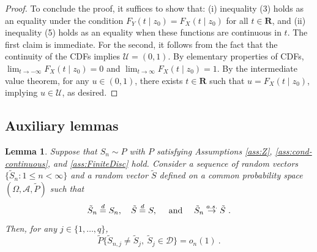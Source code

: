 \documentclass[11pt]{article}
\numberwithin{equation}{section}
\newtheorem{lemma}{Lemma}%
\begin{document}
\begin{proof}
To conclude the proof, it suffices to show that:  
(i) inequality (3) holds as an equality under the condition \( F_Y(t \mid z_{0}) = F_X(t \mid z_{0}) \) for all \( t \in \mathbf{R} \), and  
(ii) inequality (5) holds as an equality when these functions are continuous in \( t \).  
The first claim is immediate. For the second, it follows from the fact that the continuity of the CDFs implies \( \mathcal{U} = (0,1) \). By elementary properties of CDFs, $
\lim_{t \to -\infty} F_X(t \mid z_{0}) = 0$ and $\lim_{t \to \infty} F_X(t \mid z_{0}) = 1$. By the intermediate value theorem, for any \( u \in (0,1) \), there exists \( t \in \mathbf{R} \) such that \( u = F_X(t \mid z_{0}) \), implying \( u \in \mathcal{U} \), as desired.
\end{proof}

\subsection{Auxiliary lemmas}

\begin{lemma}
\label{lemma:equal-value-at-limit-S} 
Suppose that $S_n \sim P$ with $P$ satisfying Assumptions \ref{ass:Z}, \ref{ass:cond-continuous}, and \ref{ass:FiniteDisc} hold. Consider a sequence of random vectors $\{\tilde{S}_{n}:1\le n< \infty \}$ and a random vector $\tilde{S}$ defined on a common probability space $ (\Omega ,\mathcal{A},\tilde{P})$ such that
\begin{equation}
\Tilde{S}_{n}\overset{d}{=}S_{n},\quad \Tilde{S}\overset{d}{=}S,\quad \text{ and } \quad \Tilde{S}_{n}\overset{a.s.}{\to }\Tilde{S}~.
\label{eq:DCTimplication}
\end{equation}
Then, for any $j\in \{1,\dots ,q\}$,
\begin{equation*}
\tilde{P}\{\tilde{S}_{n,j}\neq \tilde{S}_{j},~\tilde{S}_{j}\in \mathcal{D} \}=o_{n}(1)~. 
\end{equation*}
\end{lemma}
\end{document}
